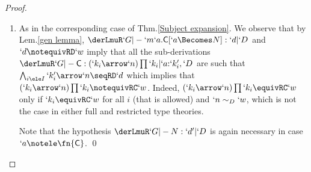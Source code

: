 \documentclass{lmcs}
\begin{document}
 \begin{proof}

 \begin{enumerate}

\firstitem %
As in the corresponding case of Thm.\skp\ref{Subject expansion}, observing that term types have to be in $\LangR_D$, we have that $`d$ and $`d'$ cannot be equivalent to $`w$.
Remark that in the proof of Thm.\skp\ref{Subject expansion} the fact that $`d'$ might be equivalent to $`w$ is of use omly in case $x\notele \fv{M}$.
Here we have to assume $ \derLmuR `G |- N : `d' | `D $, since otherwise $ \derLmuR `G |- (`l x.M)N : `d | `D $ is not derivable.

\item %
As in the corresponding case of Thm.\skp\ref{Subject expansion}.
We observe that by Lem.\skp\ref{gen lemma}, $\derLmuR `G |- {`m `a.\Cmd[`a \Becomes N]} : `d | `D $ and $`d \notequivRD `w$ imply that all the sub-derivations $\derLmuR `G |- \Cmd : (`k_i\arrow`n)\prod `k_i | `a{:}`k'_i,`D $ are such that $\bigwedge_{i\ele I}`k'_i\arrow`n \seqRD `d$ which implies that $(`k_i\arrow`n)\prod `k_i \notequivRC `w$.
Indeed, $(`k_i\arrow`n)\prod `k_i \equivRC `w$ only if $`k_i \equivRC `w$ for all $i$ (that is allowed) and $`n \sim_D `w$, which is not the case in either full and restricted type theories.

Note that the hypothesis $\derLmuR `G |- N : `d' | `D $ is again necessary in case $`a \notele \fn{\Cmd}$. \qed

 \end{enumerate}
 \end{proof}
 
 
\end{document}
